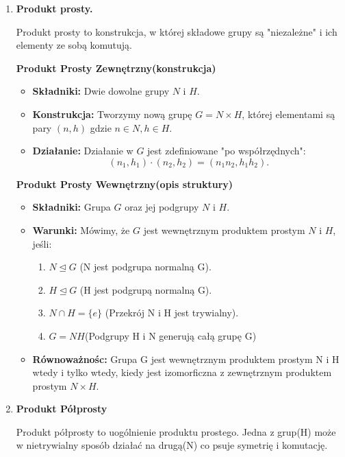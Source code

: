 	\begin{enumerate}[label=\arabic*)]
		\item \textbf{Produkt prosty.}

			Produkt prosty to konstrukcja, w której składowe grupy są "niezależne" i ich elementy ze sobą komutują.
			
			\textbf{Produkt Prosty Zewnętrzny(konstrukcja)}
			\begin{itemize}
				\item \textbf{Składniki:} Dwie dowolne grupy $N$ i $H$.
				\item \textbf{Konstrukcja:} Tworzymy nową grupę $G = N\times H$, której elementami są pary $\left( n,h \right)$ gdzie $n\in N, h\in H$.
				\item \textbf{Działanie:} Działanie w $G$ jest zdefiniowane "po współrzędnych":
					\[
						\left( n_1,h_1 \right) \cdot \left( n_2, h_2 \right) = \left( n_1n_2, h_1h_2 \right) 
					.\] 
			\end{itemize}
			
			\textbf{Produkt Prosty Wewnętrzny(opis struktury)}
			\begin{itemize}
				\item \textbf{Składniki:} Grupa $G$ oraz jej podgrupy $N$ i $H$.
				\item \textbf{Warunki:} Mówimy, że $G$ jest wewnętrznym produktem prostym $N$ i $H$, jeśli:
					\begin{enumerate}[label=\roman*)]
						\item $N\unlhd G$ (N jest podgrupa normalną G).
						\item $H\unlhd G$ (H jest podgrupą normalną G).
						\item $N \cap H = \{e\} $ (Przekrój N i H jest trywialny).
						\item $G = NH$(Podgrupy H i N generują całą grupę G)
					\end{enumerate}
				\item \textbf{Równoważnośc:} Grupa G jest wewnętrznym produktem prostym N i H wtedy i tylko wtedy, kiedy jest izomorficzna z zewnętrznym produktem prostym $N\times H$. 
			\end{itemize}
		\item \textbf{Produkt Półprosty}
		
			Produkt półprosty to uogólnienie produktu prostego. Jedna z grup(H) może w nietrywialny sposób działać na drugą(N) co psuje symetrię i komutację.


\end{enumerate}
